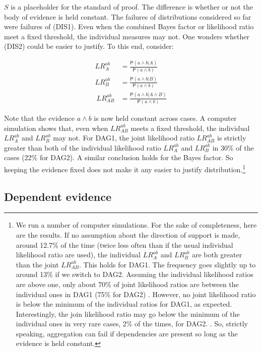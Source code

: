 \documentclass[
  10pt,
  dvipsnames,enabledeprecatedfontcommands]{scrartcl}
\newcommand{\pr}[1]{\ensuremath{\mathsf{P}(#1)}}
\begin{document}
\noindent \(S\) is a placeholder for the standard of proof. The
difference is whether or not the body of evidence is held constant. The
failures of distributions considered so far were failures of (DIS1).
Even when the combined Bayes factor or likelihood ratio meet a fixed
threshold, the individual measures may not. One wonders whether (DIS2)
could be easier to justify. To this end, consider:

\begin{align*}
LR_A^{ab}  & =  \frac{\pr{a \wedge b \vert A}}{\pr{a \wedge b}}\\
LR_B^{ab} & = \frac{\pr{a \wedge b \vert B}}{\pr{a \wedge b}}\\\
LR_{AB}^{ab}  & =  \frac{\pr{a\wedge b \vert A \wedge B}}{\pr{a \wedge b}}
\end{align*}

\noindent Note that the evidence \(a\wedge b\) is now held constant
across cases. A computer simulation shows that, even when
\(LR_{AB}^{ab}\) meets a fixed threshold, the individual \(LR_A^{ab}\)
and \(LR_B^{ab}\) may not. For \textsf{DAG1}, the joint likelihood ratio
\(LR_{AB}^{ab}\) is strictly greater than both of the individual
likelihood ratio \(LR_{A}^{ab}\) and \(LR_{B}^{ab}\) in 30\% of the
cases (22\% for \textsf{DAG2}). A similar conclusion holds for the Bayes
factor. So keeping the evidence fixed does not make it any easier to
justify distribution.\footnote{We run a number of computer simulations.
  For the sake of completeness, here are the results. If no assumption
  about the direction of support is made, around 12.7\% of the time
  (twice less often than if the usual individual likelihood ratio are
  used), the individual \(LR_A^{ab}\) and \(LR_B^{ab}\) are both greater
  than the joint \(LR_{AB}^{ab}\). This holds for \textsf{DAG1}. The
  frequency goes slightly up to around 13\% if we switch to
  \textsf{DAG2}. Assuming the individual likelihood ratios are above
  one, only about 70\% of joint likelihood ratios are between the
  individual ones in \textsf{DAG1} (75\% for \textsf{DAG2}) . However,
  no joint likelihood ratio is below the minimum of the individual
  ratios for \textsf{DAG1}, as expected. Interestingly, the join
  likelihood ratio may go below the minimum of the individual ones in
  very rare cases, 2\% of the times, for \textsf{DAG2}. . So, strictly
  speaking, aggregation can fail if dependencies are present so long as
  the evidence is held constant.}

\hypertarget{dependent-evidence}{%
\subsection*{Dependent evidence}\label{dependent-evidence}}
\end{document}
